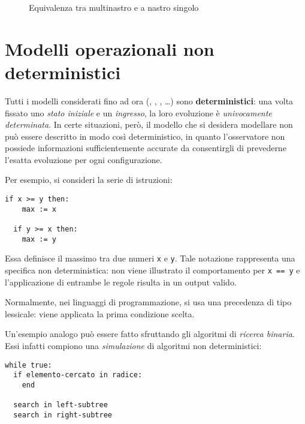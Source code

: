 \documentclass[italian, 10pt]{article}
\begin{document}
\begin{figure}[htbp]
  \bigskip
  \centering
  \caption{Equivalenza tra \TM multinastro e \TM a nastro singolo}
  \label{fig:configurazione-MT-nastro-singolo}
  \bigskip
\end{figure}

\clearpage

\section{Modelli operazionali non deterministici}
\label{sec:non-determinismo}

Tutti i modelli considerati fino ad ora (\FSA, \PDA, \TM, \ldots) sono \textbf{deterministici}: una volta fissato uno \textit{stato iniziale} e un \textit{ingresso}, la loro evoluzione è \textit{univocamente determinata}.
In certe situazioni, però, il modello che si desidera modellare non può essere descritto in modo così deterministico, in quanto l'osservatore non possiede informazioni sufficientemente accurate da consentirgli di prevederne l'esatta evoluzione per ogni configurazione.

Per esempio, si consideri la serie di istruzioni:

\begin{center}
  \begin{lstlisting}[style=pseudocode, numbers=none]
  if x >= y then:
    max := x

  if y >= x then:
    max := y
\end{lstlisting}
\end{center}

Essa definisce il massimo tra due numeri \texttt{x} e \texttt{y}.
Tale notazione rappresenta una specifica non deterministica: non viene illustrato il comportamento per \texttt{x == y} e l'applicazione di entrambe le regole risulta in un output valido.

Normalmente, nei linguaggi di programmazione, si usa una precedenza di tipo lessicale: viene applicata la prima condizione scelta.

Un'esempio analogo può essere fatto sfruttando gli algoritmi di \textit{ricerca binaria}.
Essi infatti compiono una \textit{simulazione} di algoritmi non deterministici:

\begin{center}
  \begin{lstlisting}[style=pseudocode, numbers=none]
while true:
  if elemento-cercato in radice:
    end

  search in left-subtree
  search in right-subtree
\end{lstlisting}
\end{center}
\end{document}
